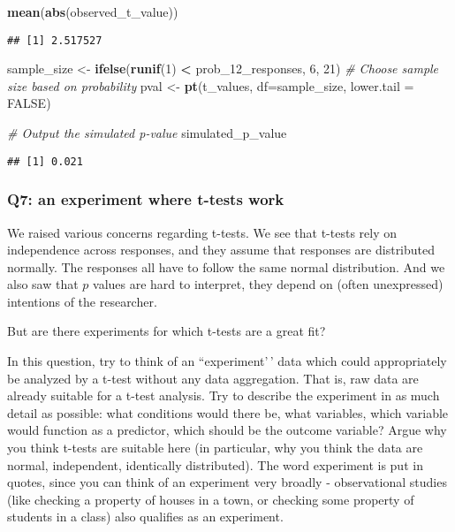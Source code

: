 \documentclass[
]{article}
\newenvironment{Shaded}{\begin{snugshade}}{\end{snugshade}}
\newcommand{\AttributeTok}[1]{\textcolor[rgb]{0.13,0.29,0.53}{#1}}
\newcommand{\CommentTok}[1]{\textcolor[rgb]{0.56,0.35,0.01}{\textit{#1}}}
\newcommand{\ConstantTok}[1]{\textcolor[rgb]{0.56,0.35,0.01}{#1}}
\newcommand{\DecValTok}[1]{\textcolor[rgb]{0.00,0.00,0.81}{#1}}
\newcommand{\FunctionTok}[1]{\textcolor[rgb]{0.13,0.29,0.53}{\textbf{#1}}}
\newcommand{\NormalTok}[1]{#1}
\newcommand{\OtherTok}[1]{\textcolor[rgb]{0.56,0.35,0.01}{#1}}
\newcommand{\SpecialCharTok}[1]{\textcolor[rgb]{0.81,0.36,0.00}{\textbf{#1}}}
\begin{document}
\begin{Shaded}
\begin{Highlighting}[]
\FunctionTok{mean}\NormalTok{(}\FunctionTok{abs}\NormalTok{(observed\_t\_value))}
\end{Highlighting}
\end{Shaded}

\begin{verbatim}
## [1] 2.517527
\end{verbatim}

\begin{Shaded}
\begin{Highlighting}[]
\NormalTok{sample\_size }\OtherTok{\textless{}{-}} \FunctionTok{ifelse}\NormalTok{(}\FunctionTok{runif}\NormalTok{(}\DecValTok{1}\NormalTok{) }\SpecialCharTok{\textless{}}\NormalTok{ prob\_12\_responses, }\DecValTok{6}\NormalTok{, }\DecValTok{21}\NormalTok{)  }\CommentTok{\# Choose sample size based on probability}
\NormalTok{pval }\OtherTok{\textless{}{-}} \FunctionTok{pt}\NormalTok{(t\_values, }\AttributeTok{df=}\NormalTok{sample\_size, }\AttributeTok{lower.tail =} \ConstantTok{FALSE}\NormalTok{)}

\CommentTok{\# Output the simulated p{-}value}
\NormalTok{simulated\_p\_value}
\end{Highlighting}
\end{Shaded}

\begin{verbatim}
## [1] 0.021
\end{verbatim}

\hypertarget{q7-an-experiment-where-t-tests-work}{%
\subsubsection{Q7: an experiment where t-tests
work}\label{q7-an-experiment-where-t-tests-work}}

We raised various concerns regarding t-tests. We see that t-tests rely
on independence across responses, and they assume that responses are
distributed normally. The responses all have to follow the same normal
distribution. And we also saw that \(p\) values are hard to interpret,
they depend on (often unexpressed) intentions of the researcher.

But are there experiments for which t-tests are a great fit?

In this question, try to think of an ``experiment'\,' data which could
appropriately be analyzed by a t-test without any data aggregation. That
is, raw data are already suitable for a t-test analysis. Try to describe
the experiment in as much detail as possible: what conditions would
there be, what variables, which variable would function as a predictor,
which should be the outcome variable? Argue why you think t-tests are
suitable here (in particular, why you think the data are normal,
independent, identically distributed). The word experiment is put in
quotes, since you can think of an experiment very broadly -
observational studies (like checking a property of houses in a town, or
checking some property of students in a class) also qualifies as an
experiment.
\end{document}
